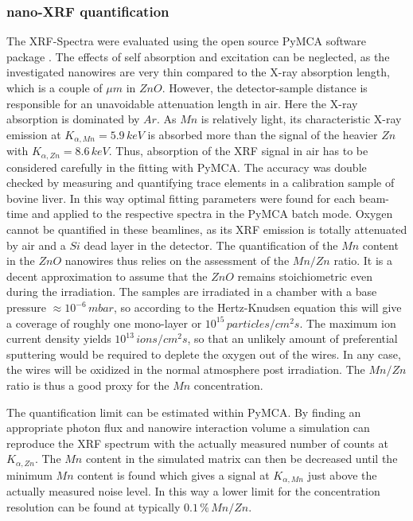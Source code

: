\subsubsection{nano-XRF quantification}

The XRF-Spectra were evaluated using the open source PyMCA software package \cite{sole_multiplatform_2007}. The effects of self absorption and excitation can be neglected, as the investigated nanowires are very thin compared to the X-ray absorption length, which is a couple of $\mu m$ in $ZnO$. However, the detector-sample distance is responsible for an unavoidable attenuation length in air. Here the X-ray absorption is dominated by $Ar$. As $Mn$ is relatively light, its characteristic X-ray emission at $K_{\alpha,Mn} = 5.9\,keV$ is absorbed more than the signal of the heavier $Zn$ with $K_{\alpha,Zn} = 8.6\,keV$. Thus, absorption of the XRF signal in air has to be considered carefully in the fitting with PyMCA. The accuracy was double checked by measuring and quantifying trace elements in a calibration sample of bovine liver. In this way optimal fitting parameters were found for each beam-time and applied to the respective spectra in the PyMCA batch mode.  Oxygen cannot be quantified in these beamlines, as its XRF emission is totally attenuated by air and a $Si$ dead layer in the detector. The quantification of the $Mn$ content in the $ZnO$ nanowires thus relies on the assessment of the $Mn/Zn$ ratio. It is a decent approximation to assume that the $ZnO$ remains stoichiometric even during the irradiation. The samples are irradiated in a chamber with a base pressure $\approx 10^{-6}\,mbar$, so according to the Hertz-Knudsen equation this will give a coverage of roughly one mono-layer or $10^{15}\,particles/cm^2s$. The maximum ion current density yields $10^{13}\,ions/cm^2s$, so that an unlikely amount of preferential sputtering would be required to deplete the oxygen out of the wires. In any case, the wires will be oxidized in the normal atmosphere post irradiation. The $Mn/Zn$ ratio is thus a good proxy for the $Mn$ concentration.

The quantification limit can be estimated within PyMCA. By finding an appropriate photon flux and nanowire interaction volume a simulation can reproduce the XRF spectrum with the actually measured number of counts at $K_{\alpha,Zn}$. The $Mn$ content in the simulated matrix can then be decreased until the minimum $Mn$ content is found which gives a signal at $K_{\alpha,Mn}$ just above the actually measured noise level. In this way a lower limit for the concentration resolution can be found at typically $0.1\,\%\,Mn/Zn$.



